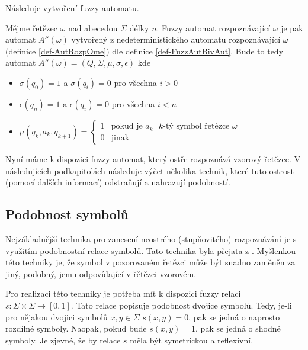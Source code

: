 \documentclass[a4paper,10pt]{article}
\begin{document}
Následuje vytvoření fuzzy automatu.

\begin{definition} \label{def-FuzzAutRozpOme}
  Mějme řetězec $\omega$ nad abecedou $\Sigma$ délky $n$. Fuzzy automat rozpoznávající $\omega$ je pak automat $A''(\omega)$ vytvořený z nedeterministického automatu rozpoznávající $\omega$ (definice \ref{def-AutRozpOme}) dle definice \ref{def-FuzzAutBivAut}. Bude to tedy automat $A''(\omega) = ( Q, \Sigma, \mu, \sigma, \epsilon )$ kde
  \begin{itemize}
   \item $\sigma(q_0) = 1$ a $\sigma(q_i) = 0$ pro všechna $i > 0$
   \item $\epsilon(q_n) = 1$ a $\epsilon(q_i) = 0$ pro všechna $i < n$
   \item $\mu(q_{k}, a_k, q_{k+1}) = 
      \begin{cases}
	1		&\text{pokud je $a_k$ $k$-tý symbol řetězce $\omega$} \\
	0		&\text{jinak}
      \end{cases}
      $
  \end{itemize}
\end{definition}

Nyní máme k dispozici fuzzy automat, který ostře rozpoznává vzorový řetězec. V následujících podkapitolách následuje výčet několika technik, které tuto ostrost (pomocí dalších informací) odstraňují a nahrazují podobností.

\subsection{Podobnost symbolů}
Nejzákladnější technika pro zanesení neostrého (stupňovitého) rozpoznávání je s využitím podobnostní relace symbolů. Tato technika byla přejata z \cite{RamGir-ConvFinAutFuzzAutStrComp}. Myšlenkou této techniky je, že symbol v pozorovaném řetězci může být snadno zaměněn za jiný, podobný, jemu odpovídající v řětězci vzorovém.

Pro realizaci této techniky je potřeba mít k dispozici fuzzy relaci $s: \Sigma \times \Sigma \rightarrow [0, 1]$. Tato relace popisuje podobnost dvojice symbolů. Tedy, je-li pro nějakou dvojici symbolů $x, y \in \Sigma$  $s(x, y) = 0$, pak se jedná o naprosto rozdílné symboly. Naopak, pokud bude $s(x, y) = 1$, pak se jedná o shodné symboly. Je zjevné, že by relace $s$ měla být symetrickou a reflexivní. 
\end{document}
